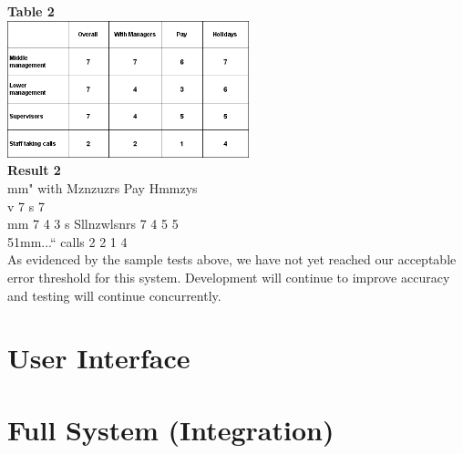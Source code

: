 \documentclass[a4paper,12pt]{article}
\begin{document}
		\textbf {Table 2}\\
		\includegraphics[width=7cm]{Images/Tables/8Table9.png}\\
		
		\textbf{Result 2}\\
		mm" with Mznzuzrs Pay Hmmzys\\
		 v 7 s 7\\
		mm 7 4 3 s
		Sllnzwlsnrs 7 4 5 5\\
		51mm...“ calls 2 2 1 4\\
		
		
		As evidenced by the sample tests above, we have not yet reached our acceptable error threshold for this system. Development will continue to improve accuracy and testing will continue concurrently.
\section{User Interface}

\section{Full System (Integration)}
\end{document}
